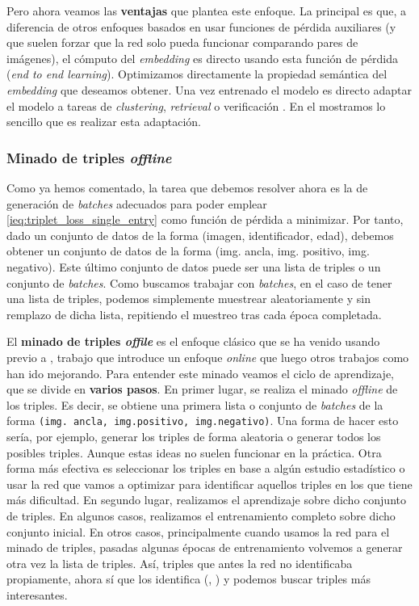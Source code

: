 Pero ahora veamos las \textbf{ventajas} que plantea este enfoque. La principal es que, a diferencia de otros enfoques basados en usar funciones de pérdida auxiliares (y que suelen forzar que la red solo pueda funcionar comparando pares de imágenes), el cómputo del \textit{embedding} es directo usando esta función de pérdida (\textit{end to end learning}). Optimizamos directamente la propiedad semántica del \textit{embedding} que deseamos obtener. Una vez entrenado el modelo es directo adaptar el modelo a tareas de \textit{clustering}, \textit{retrieval} o verificación \cite{informatica:principal}. En el  mostramos lo sencillo que es realizar esta adaptación.

\subsubsection{Minado de triples \textit{offline}} \label{isubs:enfoque_offline_minado_triples}

Como ya hemos comentado, la tarea que debemos resolver ahora es la de generación de \textit{batches} adecuados para poder emplear \eqref{ieq:triplet_loss_single_entry} como función de pérdida a minimizar. Por tanto, dado un conjunto de datos de la forma (imagen, identificador, edad), debemos obtener un conjunto de datos de la forma (img. ancla, img. positivo, img. negativo). Este último conjunto de datos puede ser una lista de triples o un conjunto de \textit{batches}. Como buscamos trabajar con \textit{batches}, en el caso de tener una lista de triples, podemos simplemente muestrear aleatoriamente y sin remplazo de dicha lista, repitiendo el muestreo tras cada época completada.

El \textbf{minado de triples \textit{offile}} es el enfoque clásico que se ha venido usando previo a \cite{informatica:facenet}, trabajo que introduce un enfoque \textit{online} que luego otros trabajos como \cite{informatica:principal} han ido mejorando. Para entender este minado veamos el ciclo de aprendizaje, que se divide en \textbf{varios pasos}. En primer lugar, se realiza el minado \textit{offline} de los triples. Es decir, se obtiene una primera lista o conjunto de \textit{batches} de la forma \lstinline{(img. ancla, img.positivo, img.negativo)}. Una forma de hacer esto sería, por ejemplo, generar los triples de forma aleatoria o generar todos los posibles triples. Aunque estas ideas no suelen funcionar en la práctica. Otra forma más efectiva es seleccionar los triples en base a algún estudio estadístico o usar la red que vamos a optimizar para identificar aquellos triples en los que tiene más dificultad. En segundo lugar, realizamos el aprendizaje sobre dicho conjunto de triples. En algunos casos, realizamos el entrenamiento completo sobre dicho conjunto inicial. En otros casos, principalmente cuando usamos la red para el minado de triples, pasadas algunas épocas de entrenamiento volvemos a generar otra vez la lista de triples. Así, triples que antes la red no identificaba propiamente, ahora sí que los identifica (, \cite{informatica:facenet}) y podemos buscar triples más interesantes.

